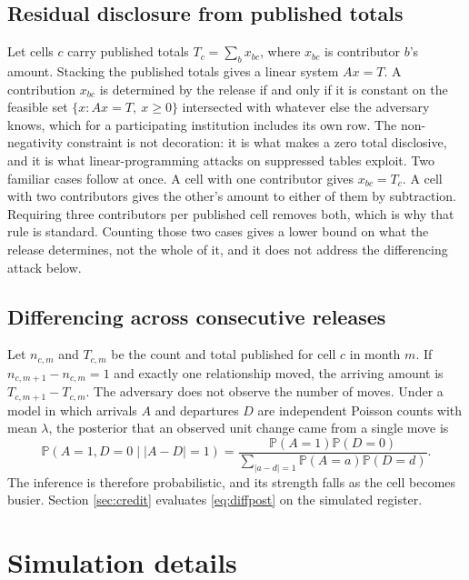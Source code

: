 \documentclass[11pt,a4paper]{article}
\theoremstyle{plain}
\theoremstyle{definition}
\newcommand{\Prob}{\mathbb{P}}
\begin{document}
\subsection{Residual disclosure from published totals}

Let cells $c$ carry published totals $T_c=\sum_b x_{bc}$, where $x_{bc}$ is
contributor $b$'s amount. Stacking the published totals gives a linear system
$Ax=T$. A contribution $x_{bc}$ is determined by the release if and only if it is constant
on the feasible set $\{x : Ax=T,\ x\ge 0\}$ intersected with whatever else the
adversary knows, which for a participating institution includes its own row. The
non-negativity constraint is not decoration: it is what makes a zero total
disclosive, and it is what linear-programming attacks on suppressed tables
exploit. Two familiar cases follow at once. A cell with one contributor gives
$x_{bc}=T_c$. A cell with two contributors gives the other's amount to either of
them by subtraction. Requiring three contributors per published cell removes both, which is why that
rule is standard. Counting those two cases gives a lower bound on what the release
determines, not the whole of it, and it does not address the differencing attack
below.

\subsection{Differencing across consecutive releases}

Let $n_{c,m}$ and $T_{c,m}$ be the count and total published for cell $c$ in month
$m$. If $n_{c,m+1}-n_{c,m}=1$ and exactly one relationship moved, the arriving
amount is $T_{c,m+1}-T_{c,m}$. The adversary does not observe the number of moves.
Under a model in which arrivals $A$ and departures $D$ are independent Poisson
counts with mean $\lambda$, the posterior that an observed unit change came from a
single move is
\begin{equation}
\Prob(A=1,D=0\mid |A-D|=1)
=\frac{\Prob(A=1)\Prob(D=0)}
 {\sum_{|a-d|=1}\Prob(A=a)\Prob(D=d)} .
\label{eq:diffpost}
\end{equation}
The inference is therefore probabilistic, and its strength falls as the cell
becomes busier. Section \ref{sec:credit} evaluates \eqref{eq:diffpost} on the
simulated register.

\section{Simulation details}\label{app:sim}
\end{document}
